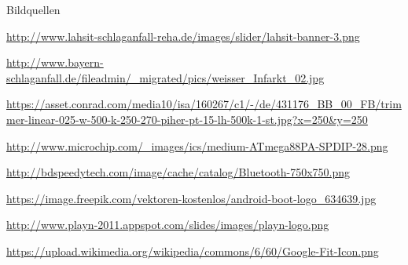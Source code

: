 \documentclass[hyphens]{beamer}
\begin{document}
 \begin{frame}{Bildquellen}
 \begin{itemize}
 \tiny{\item \url{http://www.lahsit-schlaganfall-reha.de/images/slider/lahsit-banner-3.png}}
 \item \tiny{\url{http://www.bayern-schlaganfall.de/fileadmin/_migrated/pics/weisser_Infarkt_02.jpg}}
 \item \tiny{\url{https://asset.conrad.com/media10/isa/160267/c1/-/de/431176_BB_00_FB/trimmer-linear-025-w-500-k-250-270-piher-pt-15-lh-500k-1-st.jpg?x=250&y=250}}
 \item \tiny{\url{http://www.microchip.com/_images/ics/medium-ATmega88PA-SPDIP-28.png}}
 \item \tiny{\url{http://bdspeedytech.com/image/cache/catalog/Bluetooth-750x750.png}}
 \item \tiny{\url{https://image.freepik.com/vektoren-kostenlos/android-boot-logo_634639.jpg}}
 \item \tiny{\url{http://www.playn-2011.appspot.com/slides/images/playn-logo.png}}
 \item \tiny{\url{https://upload.wikimedia.org/wikipedia/commons/6/60/Google-Fit-Icon.png}}
 \end{itemize}
 \end{frame}
 
 \begin{frame}
 \titlepage
 \end{frame}
  
\end{document}
